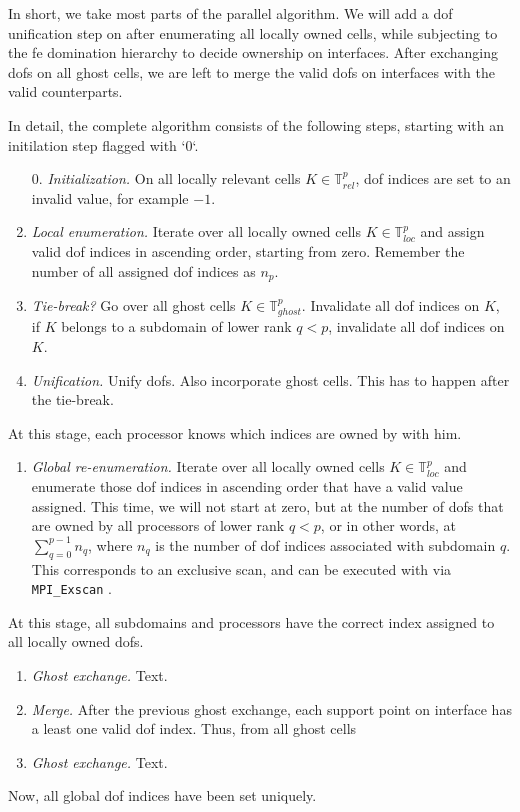 In short, we take most parts of the parallel algorithm. We will add a \gls{dof} unification step on after enumerating all locally owned cells, while subjecting to the fe domination hierarchy to decide ownership on interfaces. After exchanging \glspl{dof} on all ghost cells, we are left to merge the valid \glspl{dof} on interfaces with the valid counterparts.

In detail, the complete algorithm consists of the following steps, starting with an initilation step flagged with `0`.
\begin{enumerate}
  \item[0.] \textit{Initialization.}
  On all locally relevant cells $K \in \mathbb{T}^p_{rel}$, \gls{dof} indices are set to an invalid value, for example $-1$.
  \item \textit{Local enumeration.}
  Iterate over all locally owned cells $K \in \mathbb{T}^p_{loc}$ and assign valid \gls{dof} indices in ascending order, starting from zero. Remember the number of all assigned \gls{dof} indices as $n_p$.
  \item \textit{Tie-break?}
  Go over all ghost cells $K \in \mathbb{T}^p_{ghost}$. Invalidate all \gls{dof} indices on $K$, if $K$ belongs to a subdomain of lower rank $q < p$, invalidate all \gls{dof} indices on $K$.
  \item \textit{Unification.}
  Unify \glspl{dof}. Also incorporate ghost cells. This has to happen after the tie-break.
\end{enumerate}
At this stage, each processor knows which indices are owned by with him.
\begin{enumerate}[resume]
  \item \textit{Global re-enumeration.}
  Iterate over all locally owned cells $K \in \mathbb{T}^p_{loc}$
  and enumerate those \gls{dof} indices in ascending order that have a valid value assigned. This time, we will not start at zero, but at the number of \glspl{dof} that are owned by all processors of lower rank $q < p$, or in other words, at $\sum_{q=0}^{p-1} n_q$, where $n_q$ is the number of \gls{dof} indices associated with subdomain $q$. This corresponds to an exclusive scan, and can be executed with via \texttt{MPI\_Exscan} \parencite{mpi31}.
\end{enumerate}
At this stage, all subdomains and processors have the correct index assigned to all locally owned \glspl{dof}.
\begin{enumerate}[resume]
  \item \textit{Ghost exchange.}
  Text.
  \item \textit{Merge.}
  After the previous ghost exchange, each support point on interface has a least one valid \gls{dof} index. Thus, from all ghost cells 
  \item \textit{Ghost exchange.}
  Text.
\end{enumerate}
Now, all global \gls{dof} indices have been set uniquely.


